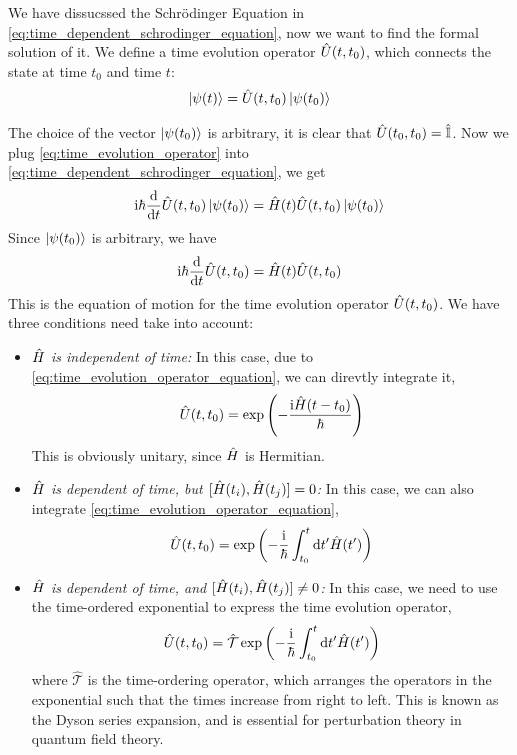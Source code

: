 We have dissucssed the Schrödinger Equation in \cref{eq:time_dependent_schrodinger_equation}, now we want to find the formal solution of it. We define a time evolution operator $\hat{U}(t,t_0)$, which connects the state at time $t_0$ and time $t$:
\begin{align}
    \ket{\psi(t)} = \hat{U}(t,t_0) \ket{\psi(t_0)} \label{eq:time_evolution_operator}
\end{align}

The choice of the vector $\ket{\psi(t_0)}$ is arbitrary, it is clear that $\hat{U}(t_0,t_0) = \hat{\mathbb{I}}$. Now we plug \cref{eq:time_evolution_operator} into \cref{eq:time_dependent_schrodinger_equation}, we get
\begin{align}
    \mathrm{i} \hbar \frac{\mathrm{d}}{\mathrm{d} t} \hat{U}(t,t_0) \ket{\psi(t_0)} = \hat{H}(t) \hat{U}(t,t_0) \ket{\psi(t_0)}
\end{align}
Since $\ket{\psi(t_0)}$ is arbitrary, we have
\begin{align}
    \mathrm{i} \hbar \frac{\mathrm{d}}{\mathrm{d} t} \hat{U}(t,t_0) = \hat{H}(t) \hat{U}(t,t_0) \label{eq:time_evolution_operator_equation}
\end{align}
This is the equation of motion for the time evolution operator $\hat{U}(t,t_0)$. We have three conditions need take into account:
\begin{itemize}
    \item \emph{$\hat{H}$ is independent of time:} In this case, due to \cref{eq:time_evolution_operator_equation}, we can direvtly integrate it,
    \begin{align}
        \hat{U}(t,t_0) = \exp \left(- \frac{\mathrm{i} \hat{H} (t-t_0)}{\hbar}\right)\label{eq:time_evolution_operator_integral_equation}
    \end{align}
    This is obviously unitary, since $\hat{H}$ is Hermitian.
    \item \emph{$\hat{H}$ is dependent of time, but $[\hat{H}(t_i),\hat{H}(t_j)]=0$:} In this case, we can also integrate \cref{eq:time_evolution_operator_equation},
    \begin{align}
        \hat{U}(t,t_0) = \exp \left(- \frac{\mathrm{i}}{\hbar} \int_{t_0}^{t} \mathrm{d} t' \hat{H}(t') \right) \label{eq:time_evolution_operator_time_dependent_commute}
    \end{align}
    \item \emph{$\hat{H}$ is dependent of time, and $[\hat{H}(t_i),\hat{H}(t_j)] \neq 0$:} In this case, we need to use the time-ordered exponential to express the time evolution operator,
    \begin{align}
        \hat{U}(t,t_0) = \hat{\mathcal{T}}\exp \left(- \frac{\mathrm{i}}{\hbar} \int_{t_0}^{t} \mathrm{d} t' \hat{H}(t') \right) \label{eq:time_evolution_operator_time_dependent_noncommute}
    \end{align}
    where $\hat{\mathcal{T}}$ is the time-ordering operator, which arranges the operators in the exponential such that the times increase from right to left. This is known as the Dyson series expansion, and is essential for perturbation theory in quantum field theory.
\end{itemize}

